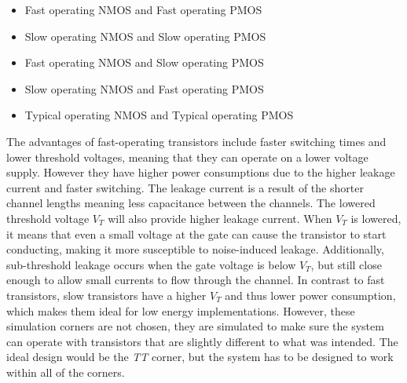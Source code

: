 \begin{itemize}
    \item {}  Fast operating NMOS and Fast operating PMOS 
    \item {}  Slow operating NMOS and Slow operating PMOS 
    \item {}  Fast operating NMOS and Slow operating PMOS 
    \item {}  Slow operating NMOS and Fast operating PMOS 
    \item {}  Typical operating NMOS and Typical operating PMOS 
\end{itemize}

The advantages of fast-operating transistors include faster switching times and lower threshold voltages, meaning that they can operate on a lower voltage supply. However they have higher power consumptions due to the higher leakage current and faster switching. The leakage current is a result of the shorter channel lengths meaning less capacitance between the channels. The lowered threshold voltage $V_T$ will also provide higher leakage current. When $V_T$ is lowered, it means that even a small voltage at the gate can cause the transistor to start conducting, making it more susceptible to noise-induced leakage. Additionally, sub-threshold leakage occurs when the gate voltage is below $V_T$, but still close enough to allow small currents to flow through the channel. In contrast to fast transistors, slow transistors have a higher $V_T$ and thus lower power consumption, which makes them ideal for low energy implementations. However, these simulation corners are not chosen, they are simulated to make sure the system can operate with transistors that are slightly different to what was intended. The ideal design would be the \textit{TT} corner, but the system has to be designed to work within all of the corners.
